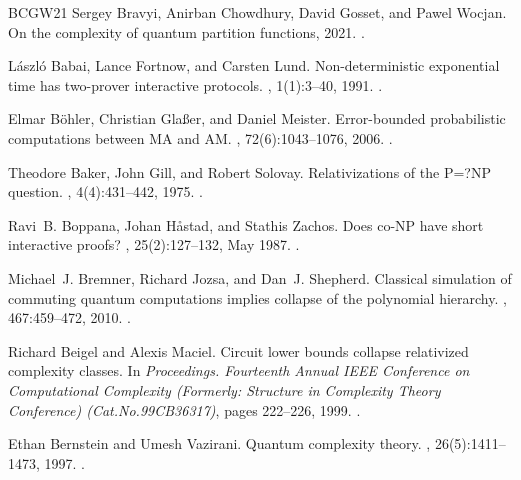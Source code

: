 \documentclass[10pt,a4paper]{article}
\begin{document}
\begin{thebibliography}{BCGW21}
Sergey Bravyi, Anirban Chowdhury, David Gosset, and Pawel Wocjan.
\newblock On the complexity of quantum partition functions, 2021.
\newblock \href {https://arxiv.org/abs/2110.15466} {}.

L\'{a}szl\'{o} Babai, Lance Fortnow, and Carsten Lund.
\newblock Non-deterministic exponential time has two-prover interactive
  protocols.
, 1(1):3--40, 1991.
\newblock \href {https://doi.org/10.1007/BF01200056}
  {}.

Elmar B{\"o}hler, Christian Gla{\ss}er, and Daniel Meister.
\newblock Error-bounded probabilistic computations between {MA} and {AM}.
, 72(6):1043--1076,
  2006.
\newblock \href {https://doi.org/10.1016/j.jcss.2006.05.001}
  {}.

Theodore Baker, John Gill, and Robert Solovay.
\newblock Relativizations of the {P=?NP} question.
, 4(4):431--442, 1975.
\newblock \href {https://doi.org/10.1137/0204037} {}.

Ravi~B. Boppana, Johan H\r{a}stad, and Stathis Zachos.
\newblock Does co-{NP} have short interactive proofs?
, 25(2):127--132, May 1987.
\newblock \href {https://doi.org/10.1016/0020-0190(87)90232-8}
  {}.

Michael~J. Bremner, Richard Jozsa, and Dan~J. Shepherd.
\newblock Classical simulation of commuting quantum computations implies
  collapse of the polynomial hierarchy.
, 467:459--472, 2010.
\newblock \href {https://doi.org/10.1098/rspa.2010.0301}
  {}.

Richard Beigel and Alexis Maciel.
\newblock Circuit lower bounds collapse relativized complexity classes.
\newblock In {\em Proceedings. Fourteenth Annual IEEE Conference on
  Computational Complexity (Formerly: Structure in Complexity Theory
  Conference) (Cat.No.99CB36317)}, pages 222--226, 1999.
\newblock \href {https://doi.org/10.1109/CCC.1999.766280}
  {}.

Ethan Bernstein and Umesh Vazirani.
\newblock Quantum complexity theory.
, 26(5):1411--1473, 1997.
\newblock \href {https://doi.org/10.1137/S0097539796300921}
  {}.


\end{thebibliography}
\end{document}
